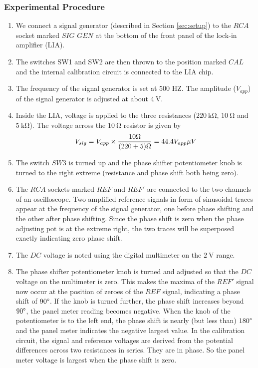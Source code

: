 \documentclass[%
 reprint,
nofootinbib,
 amsmath,amssymb,
 aps,
]{revtex4-2}
\begin{document}
    \subsubsection{Experimental Procedure}
    \begin{enumerate}
        \item We connect a signal generator (described in Section \ref{sec:setup}) to the $RCA$ socket marked $SIG$ $GEN$ at the bottom of the front panel of the lock-in amplifier (LIA).
        \item The switches SW1 and SW2 are then thrown to the position marked $CAL$ and the internal calibration circuit is connected to the LIA chip.
        \item The frequency of the signal generator is set at 500 HZ. The amplitude ($V_{app}$) of the signal generator is adjusted at about $\SI{4}{\volt}$.
        \item Inside the LIA, voltage is applied to the three resistances ($\SI{220}{\kilo \ohm}$, $\SI{10}{\ohm}$ and $\SI{5}{\kilo \ohm}$). The voltage across the $\SI{10}{\ohm}$ resistor is given by
            \begin{equation}
            \label{eq7}
                V_{sig} = V_{app} \times \dfrac{10 \ohm}{(220 + 5) \ohm} = 44.4 V_{app} \mu V
            \end{equation}
        \item The switch $SW3$ is turned up and the phase shifter potentiometer knob is turned to the right extreme (resistance and phase shift both being zero).
        \item The $RCA$ sockets marked $REF$ and $REF'$ are connected to the two channels of an oscilloscope. Two amplified reference signals in form of sinusoidal traces appear at the frequency of the signal generator, one before phase shifting and the other after phase shifting. Since the phase shift is zero when the phase adjusting pot is at the extreme right, the two traces will be superposed exactly indicating zero phase shift.
        \item The $DC$ voltage is noted using the digital multimeter on the $\SI{2}{\volt}$ range.
        \item The phase shifter potentiometer knob is turned and adjusted so that the $DC$ voltage on the multimeter is zero. This makes the maxima of the $REF'$ signal now occur at the position of zeroes of the $REF$ signal, indicating a phase shift of $90 \degree$. If the knob is turned further, the phase shift increases beyond $90 \degree$, the panel meter reading becomes negative. When the knob of the potentiometer is to the left end, the phase shift is nearly (but less than) $180 \degree$ and the panel meter indicates the negative largest value. In the calibration circuit, the signal and reference voltages are derived from the potential differences across two resistances in series. They are in phase. So the panel meter voltage is largest when the phase shift is zero.

\end{enumerate}
\end{document}
